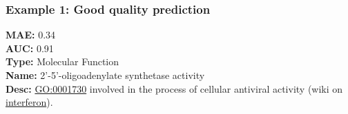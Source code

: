 \documentclass[aspectratio=169, 9pt]{beamer}
\begin{document}
\begin{frame}[t]
	\frametitle{Example 1: Good quality prediction}
	
\begin{minipage}[m]{.3\linewidth}
	\small
	\textbf{MAE:} 0.34 \\
	\textbf{AUC:} 0.91 \\
	\textbf{Type:} Molecular Function\\
	\textbf{Name:} 2'-5'-oligoadenylate synthetase activity\\
	\textbf{Desc:}  \href{http://amigo.geneontology.org/amigo/term/GO:0001730}{\alert{GO:0001730}} involved in the process of cellular antiviral activity (wiki on \href{https://en.wikipedia.org/wiki/Interferon}{\alert{interferon}}).
\end{minipage}
\begin{minipage}[m]{.65\linewidth}
	\def\tmpwdth{.9\linewidth}
\end{minipage}
\end{frame}
\end{document}
